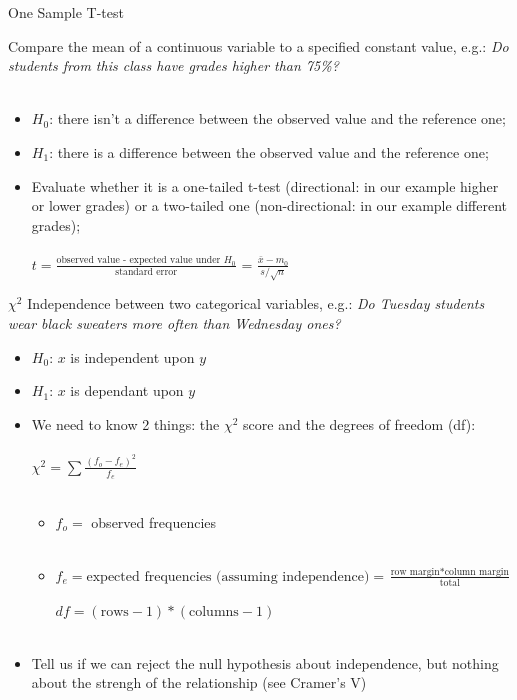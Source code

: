 \documentclass[10pt]{beamer}   %
\begin{document}


\begin{frame}{One Sample T-test}

Compare the mean of a continuous variable to a specified constant value, e.g.: \textit{Do students from this class have grades higher than 75\%?} \\~\\
\begin{itemize}
\item \textit{$H_{0}$}: there isn't a difference between the observed value and the reference one;
\item \textit{$H_{1}$}: there is a difference between the observed value and the reference one;
\item Evaluate whether it is a one-tailed t-test (directional: in our example higher or lower grades) or a two-tailed one (non-directional: in our example different grades); \\~\\
 $t =\frac{\text{observed value - expected value under $H_{0}$}}{\text{standard error}}$ = $\frac{\bar{x}-m_0}{s/\sqrt{n}}$
\end{itemize}
\end{frame}


\begin{frame}{$\chi^{2}$ }
Independence between two categorical variables, e.g.: \textit{Do Tuesday students wear black sweaters more often than Wednesday ones?}
\begin{itemize}
\item \textit{$H_{0}$}: $x$ is independent upon $y$ 
\item \textit{$H_{1}$}: $x$ is dependant upon $y$ 
\item We need to know 2 things: the $\chi^{2}$  score and the degrees of freedom (df): \\~\\
$\chi^{2}= \sum \frac{(f_{o}-f_{e})^2}{f_{e}}$ \\~\\
\begin{itemize}
         \item $f_{o} =$ observed frequencies  \\~\\
         \item $f_{e}= \text{expected frequencies (assuming independence)}=  \frac{\text{row margin}*\text{column margin}}{\text{total}}$  \\~\\
$df = (\text{rows}-1)*(\text{columns}-1)$ \\~\\ 
\end{itemize}
\item Tell us if we can reject the null hypothesis about independence, but nothing about the strengh of the relationship (see Cramer's V)
\end{itemize}
\end{frame}
\end{document}
